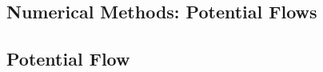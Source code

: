 \documentclass[a4paper, 12pt]{report}
\begin{document}
\begin{center}
\chapter{Numerical Methods: Potential Flows}
\begin{comment}
Only for 2D , next time please expand to 3D!
\end{comment}
\section{Potential Flow}
\begin{comment}
\end{comment}

\end{center}
\end{document}
